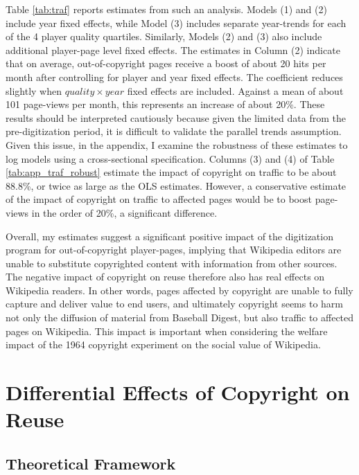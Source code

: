 \documentclass[11pt]{article}
\begin{document}
Table \ref{tab:traf} reports estimates from such an analysis. Models (1) and (2) include year fixed effects, while Model (3) includes separate year-trends for each of the 4 player quality quartiles. Similarly, Models (2) and (3) also include additional player-page level fixed effects. The estimates in Column (2) indicate that on average, out-of-copyright pages receive a boost of about 20 hits per month after controlling for player and year fixed effects. The coefficient reduces slightly when \emph{$quality \times year$} fixed effects are included. Against a mean of about 101 page-views per month, this represents an increase of about 20\%. These results should be interpreted cautiously because given the limited data from the pre-digitization period, it is difficult to validate the parallel trends assumption. Given this issue, in the appendix, I examine the robustness of these estimates to log models using a cross-sectional specification. Columns (3) and (4) of Table \ref{tab:app_traf_robust} estimate the impact of copyright on traffic to be about 88.8\%, or twice as large as the OLS estimates. However, a conservative estimate of the impact of copyright on traffic to affected pages would be to boost page-views in the order of 20\%, a significant difference.

Overall, my estimates suggest a significant positive impact of the digitization program for out-of-copyright player-pages, implying that Wikipedia editors are unable to substitute copyrighted content with information from other sources. The negative impact of copyright on reuse therefore also has real effects on Wikipedia readers. In other words, pages affected by copyright are unable to fully capture and deliver value to end users, and ultimately copyright seems to harm not only the diffusion of material from Baseball Digest, but also traffic to affected pages on Wikipedia. This impact is important when considering the welfare impact of the 1964 copyright experiment on the social value of Wikipedia. 

\section{Differential Effects of Copyright on Reuse}
\label{sec:hetero}

\subsection{Theoretical Framework}
\end{document}
